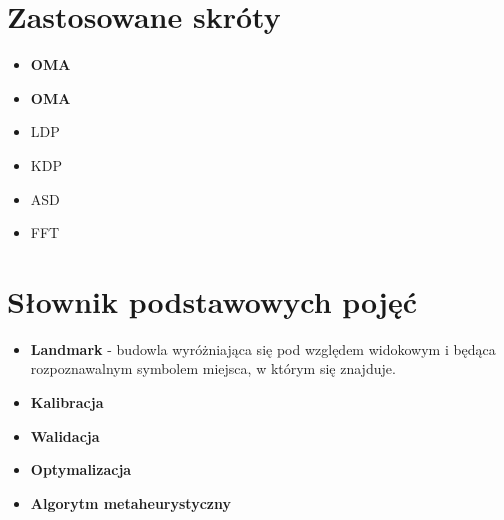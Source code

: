 \chapter*{Zastosowane skróty}
\begin{itemize}[label = {}]
	\item \textbf{OMA}
	\item \textbf{OMA}
	\item LDP
	\item KDP
	\item ASD
	\item FFT
\end{itemize}

\chapter*{Słownik podstawowych pojęć}
\begin{itemize}[label = {},leftmargin=*]
\item \textbf{Landmark} - budowla wyróżniająca się pod względem widokowym i będąca rozpoznawalnym symbolem miejsca, w którym się znajduje.
\item \textbf{Kalibracja}
\item \textbf{Walidacja}
\item \textbf{Optymalizacja}
\item \textbf{Algorytm metaheurystyczny}
\end{itemize}